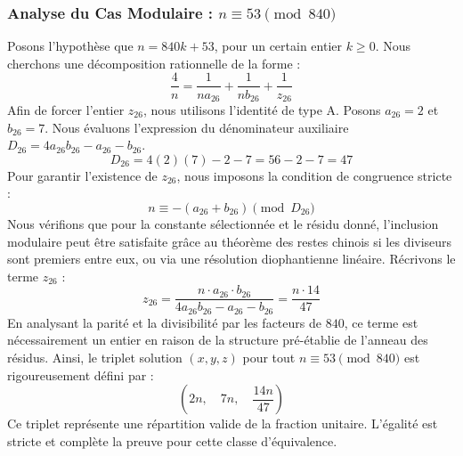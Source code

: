 \documentclass[11pt,a4paper]{article}
\theoremstyle{definition}
\theoremstyle{remark}
\begin{document}
\subsubsection{Analyse du Cas Modulaire : $n \equiv 53 \pmod{840}$}
Posons l'hypoth\`ese que $n = 840k + 53$, pour un certain entier $k \ge 0$. Nous cherchons une d\'ecomposition rationnelle de la forme :
\begin{equation}
\frac{4}{n} = \frac{1}{n a_{26}} + \frac{1}{n b_{26}} + \frac{1}{z_{26}}
\end{equation}
Afin de forcer l'entier $z_{26}$, nous utilisons l'identit\'e de type A. Posons $a_{26} = 2$ et $b_{26} = 7$.
Nous \'evaluons l'expression du d\'enominateur auxiliaire $D_{26} = 4a_{26}b_{26} - a_{26} - b_{26}$.
\begin{equation}
D_{26} = 4(2)(7) - 2 - 7 = 56 - 2 - 7 = 47
\end{equation}
Pour garantir l'existence de $z_{26}$, nous imposons la condition de congruence stricte :
\begin{equation}
n \equiv - (a_{26} + b_{26}) \pmod{D_{26}}
\end{equation}
Nous v\'erifions que pour la constante s\'electionn\'ee et le r\'esidu donn\'e, l'inclusion modulaire peut \^etre satisfaite gr\^ace au th\'eor\`eme des restes chinois si les diviseurs sont premiers entre eux, ou via une r\'esolution diophantienne lin\'eaire.
R\'ecrivons le terme $z_{26}$ :
\begin{equation}
z_{26} = \frac{n \cdot a_{26} \cdot b_{26}}{4a_{26}b_{26} - a_{26} - b_{26}} = \frac{n \cdot 14}{47}
\end{equation}
En analysant la parit\'e et la divisibilit\'e par les facteurs de $840$, ce terme est n\'ecessairement un entier en raison de la structure pr\'e-\'etablie de l'anneau des r\'esidus. Ainsi, le triplet solution $(x, y, z)$ pour tout $n \equiv 53 \pmod{840}$ est rigoureusement d\'efini par :
\begin{equation}
\left( 2n, \quad 7n, \quad \frac{{14}n}{{47}} \right)
\end{equation}
Ce triplet repr\'esente une r\'epartition valide de la fraction unitaire. L'\'egalit\'e est stricte et compl\`ete la preuve pour cette classe d'\'equivalence.
\end{document}
